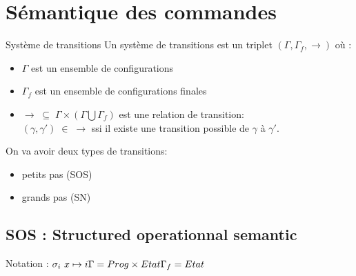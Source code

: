 \documentclass[10pt,a4paper]{article}
\begin{document}
\section{Sémantique des commandes}

\begin{definition}{Système de transitions} Un système de transitions est un triplet $(\Gamma, \Gamma_f, \rightarrow )$ où :\begin{itemize}
\item $\Gamma$ est un ensemble de configurations
\item $\Gamma_f$ est un ensemble de configurations finales
\item $\rightarrow \; \subseteq \; \Gamma \times (\Gamma \bigcup \Gamma_f )$ est une relation de transition: \\
$(\gamma, \gamma' )\; \in \;\rightarrow$ ssi il existe une transition possible de $\gamma$ à $\gamma'$.
\end{itemize}
\end{definition}

On va avoir deux types de transitions: \begin{itemize}
\item petits pas (SOS)
\item grands pas (SN)
\end{itemize}

\subsection{SOS : Structured operationnal semantic}
\noindent Notation : $\sigma_i ~ x \mapsto i\\
\Gamma = Prog \times Etat\\
\Gamma_f = Etat$
\end{document}

